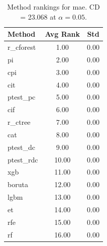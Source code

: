 \begin{table}[h]
\centering
\caption{Method rankings for mae. CD = 23.068 at $\alpha=0.05$.}
\label{tab:ranks_mae}
\begin{tabular}{lcc}
\toprule
Method & Avg Rank & Std \\
\midrule
r_cforest & 1.00 & 0.00 \\
pi & 2.00 & 0.00 \\
cpi & 3.00 & 0.00 \\
cit & 4.00 & 0.00 \\
ptest_pc & 5.00 & 0.00 \\
cif & 6.00 & 0.00 \\
r_ctree & 7.00 & 0.00 \\
cat & 8.00 & 0.00 \\
ptest_dc & 9.00 & 0.00 \\
ptest_rdc & 10.00 & 0.00 \\
xgb & 11.00 & 0.00 \\
boruta & 12.00 & 0.00 \\
lgbm & 13.00 & 0.00 \\
et & 14.00 & 0.00 \\
rfe & 15.00 & 0.00 \\
rf & 16.00 & 0.00 \\
\bottomrule
\end{tabular}
\end{table}